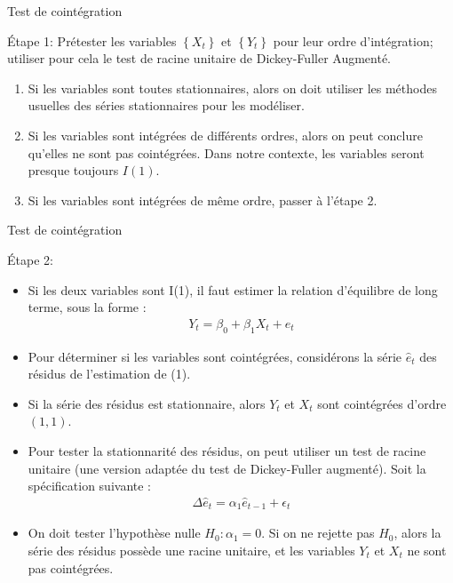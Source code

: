 \documentclass{beamer}
\begin{document}
\begin{frame}{Test de cointégration}
\begin{block}{Étape 1:}
Prétester les variables $\left\{ X_t \right\}$ et $\left\{ Y_t \right\}$ pour leur ordre d’intégration; utiliser pour cela le test de racine unitaire de Dickey-Fuller Augmenté.
\begin{enumerate}
\item Si les variables sont toutes stationnaires, alors on doit utiliser les méthodes usuelles des séries stationnaires pour les modéliser.
\item Si les variables sont intégrées de différents ordres, alors on
peut conclure qu’elles ne sont pas cointégrées. Dans notre contexte, les variables seront presque toujours $I(1)$.
\item Si les variables sont intégrées de même ordre, passer à l’étape 2.
\end{enumerate}
\end{block}
\end{frame}


\begin{frame}{Test de cointégration}
\begin{block}{Étape 2:}
\begin{itemize}
\item Si les deux variables sont I(1), il faut estimer la relation d’équilibre de long terme, sous la forme :
\begin{align*}
Y_t=\beta_0+\beta_1 X_t+e_t
\end{align*}
\item Pour déterminer si les variables sont cointégrées, considérons la série $\hat{e}_t$ des résidus de l’estimation de (1). 
\item Si la série des résidus est stationnaire, alors $Y_t$ et $X_t$ sont cointégrées d’ordre $(1,1)$. 
\item Pour tester la stationnarité des résidus, on peut utiliser un test de racine unitaire (une version adaptée du test de Dickey-Fuller augmenté). Soit la spécification suivante :
\begin{align*}
\Delta \hat{e}_t=\alpha_1 \hat{e}_{t-1}+\epsilon_t
\end{align*}
\item On doit tester l’hypothèse nulle $H_0: \alpha_1 = 0$. Si on ne rejette pas $H_0$, alors la série des résidus possède une racine unitaire, et les variables $Y_t$ et $X_t$ ne sont pas cointégrées. 
\end{itemize}
\end{block}
\end{frame}
\end{document}
